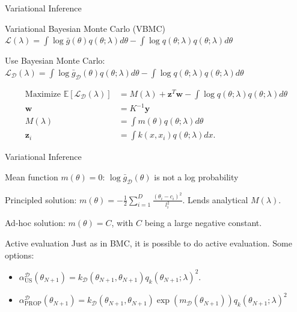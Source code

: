 \documentclass[pdf]{beamer}
\def \Ev {{\mathbb E}}
\def \gu {{\bar{g}}}
\begin{document}
\begin{frame}{Variational Inference}
\begin{block}{Variational Bayesian Monte Carlo (VBMC)}
$\mathcal{L}(\lambda) = 
 \int \log \gu(\theta) q(\theta;\lambda) d\theta - \int \log q(\theta;\lambda) q(\theta;\lambda) d\theta$
 
Use Bayesian Monte Carlo:
$\mathcal{L}_\mathcal{D}(\lambda) = 
\int \log \gu_\mathcal{D}(\theta) q(\theta;\lambda) d\theta - \int \log q(\theta;\lambda) q(\theta;\lambda) d\theta$

\begin{block}{}
\begin{equation*}
\begin{split}
\text{Maximize } \Ev[\mathcal{L}_\mathcal{D}(\lambda)] & = M(\lambda) + \mathbf{z}^T \mathbf{w} - \int \log q(\theta;\lambda) q(\theta;\lambda) d\theta\\
\mathbf{w} & = K^{-1} \mathbf{y} \\
M(\lambda) & = \int m(\theta) q(\theta;\lambda) d\theta \\
\mathbf{z}_i & = \int k(x,x_i) q(\theta;\lambda) dx.
\end{split}
\end{equation*}

\end{block}
\end{block}
\end{frame}

\begin{frame}{Variational Inference}
\begin{block}{Mean function}
$m(\theta) = 0$: $\log \gu_\mathcal{D}(\theta)$ is not a log probability

Principled solution: $m(\theta) = -\frac{1}{2} \sum_{i=1}^D \frac{(\theta_i - c_i)^2}{l_i^2}$. Lends analytical $M(\lambda)$.

Ad-hoc solution: $m(\theta) = C$, with $C$ being a large negative constant.
\end{block}

\begin{block}{Active evaluation}
Just as in BMC, it is possible to do active evaluation.
Some options:
\begin{itemize}
	\item $\alpha^\mathcal{D}_{\text{US}}(\theta_{N+1}) = k_\mathcal{D}(\theta_{N+1},\theta_{N+1}) q_k(\theta_{N+1};\lambda)^2.$
	\item $\label{prospective_vbmc}
	\alpha^\mathcal{D}_{\text{PROP}}(\theta_{N+1}) = k_\mathcal{D}(\theta_{N+1},\theta_{N+1}) \exp(m_\mathcal{D}(\theta_{N+1}))q_k(\theta_{N+1};\lambda)^2$
\end{itemize}
\end{block}
\end{frame}
\end{document}
